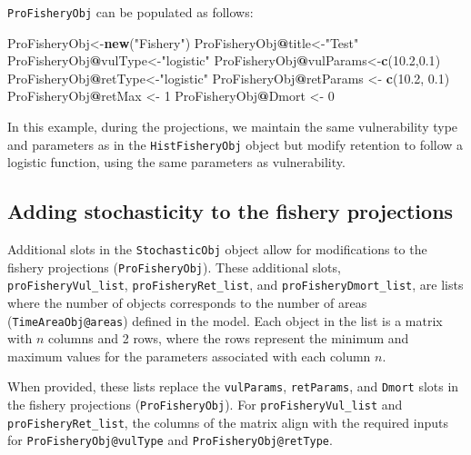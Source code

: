 \documentclass[
]{book}
\newenvironment{Shaded}{\begin{snugshade}}{\end{snugshade}}
\newcommand{\DecValTok}[1]{\textcolor[rgb]{0.00,0.00,0.81}{#1}}
\newcommand{\FloatTok}[1]{\textcolor[rgb]{0.00,0.00,0.81}{#1}}
\newcommand{\FunctionTok}[1]{\textcolor[rgb]{0.13,0.29,0.53}{\textbf{#1}}}
\newcommand{\NormalTok}[1]{#1}
\newcommand{\OtherTok}[1]{\textcolor[rgb]{0.56,0.35,0.01}{#1}}
\newcommand{\SpecialCharTok}[1]{\textcolor[rgb]{0.81,0.36,0.00}{\textbf{#1}}}
\newcommand{\StringTok}[1]{\textcolor[rgb]{0.31,0.60,0.02}{#1}}
\begin{document}
\texttt{ProFisheryObj} can be populated as follows:

\begin{Shaded}
\begin{Highlighting}[]
\NormalTok{ProFisheryObj}\OtherTok{\textless{}{-}}\FunctionTok{new}\NormalTok{(}\StringTok{"Fishery"}\NormalTok{)}
\NormalTok{ProFisheryObj}\SpecialCharTok{@}\NormalTok{title}\OtherTok{\textless{}{-}}\StringTok{"Test"}
\NormalTok{ProFisheryObj}\SpecialCharTok{@}\NormalTok{vulType}\OtherTok{\textless{}{-}}\StringTok{"logistic"}
\NormalTok{ProFisheryObj}\SpecialCharTok{@}\NormalTok{vulParams}\OtherTok{\textless{}{-}}\FunctionTok{c}\NormalTok{(}\FloatTok{10.2}\NormalTok{,}\FloatTok{0.1}\NormalTok{)}
\NormalTok{ProFisheryObj}\SpecialCharTok{@}\NormalTok{retType}\OtherTok{\textless{}{-}}\StringTok{"logistic"}
\NormalTok{ProFisheryObj}\SpecialCharTok{@}\NormalTok{retParams }\OtherTok{\textless{}{-}} \FunctionTok{c}\NormalTok{(}\FloatTok{10.2}\NormalTok{, }\FloatTok{0.1}\NormalTok{)}
\NormalTok{ProFisheryObj}\SpecialCharTok{@}\NormalTok{retMax }\OtherTok{\textless{}{-}} \DecValTok{1}
\NormalTok{ProFisheryObj}\SpecialCharTok{@}\NormalTok{Dmort }\OtherTok{\textless{}{-}} \DecValTok{0}
\end{Highlighting}
\end{Shaded}

In this example, during the projections, we maintain the same vulnerability type and parameters as in the \texttt{HistFisheryObj} object but modify retention to follow a logistic function, using the same parameters as vulnerability.

\subsection{Adding stochasticity to the fishery projections}\label{adding-stochasticity-to-the-fishery-projections}

Additional slots in the \texttt{StochasticObj} object allow for modifications to the fishery projections (\texttt{ProFisheryObj}). These additional slots, \texttt{proFisheryVul\_list}, \texttt{proFisheryRet\_list}, and \texttt{proFisheryDmort\_list}, are lists where the number of objects corresponds to the number of areas (\texttt{TimeAreaObj@areas}) defined in the model. Each object in the list is a matrix with \(n\) columns and 2 rows, where the rows represent the minimum and maximum values for the parameters associated with each column \(n\).

When provided, these lists replace the \texttt{vulParams}, \texttt{retParams}, and \texttt{Dmort} slots in the fishery projections (\texttt{ProFisheryObj}). For \texttt{proFisheryVul\_list} and \texttt{proFisheryRet\_list}, the columns of the matrix align with the required inputs for \texttt{ProFisheryObj@vulType} and \texttt{ProFisheryObj@retType}.
\end{document}
